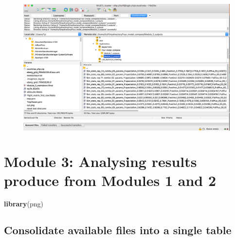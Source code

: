 \documentclass[]{book}
\newenvironment{Shaded}{\begin{snugshade}}{\end{snugshade}}
\newcommand{\KeywordTok}[1]{\textcolor[rgb]{0.13,0.29,0.53}{\textbf{{#1}}}}
\newcommand{\NormalTok}[1]{{#1}}
\theoremstyle{definition}
\theoremstyle{definition}
\theoremstyle{remark}
\begin{document}
\begin{figure}
\centering
\includegraphics{Files from module 2.png}
\caption{}
\end{figure}

\chapter{Module 3: Analysing results produce from Modules 1 and
2}\label{module-3-analysing-results-produce-from-modules-1-and-2}

\begin{Shaded}
\begin{Highlighting}[]
\KeywordTok{library}\NormalTok{(png)}
\end{Highlighting}
\end{Shaded}

\section{Consolidate available files into a single
table}\label{consolidate-available-files-into-a-single-table}
\end{document}

